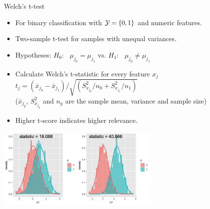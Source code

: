 \documentclass[11pt,compress,t,notes=noshow, xcolor=table]{beamer}
\begin{document}

  \begin{vbframe}{Welch's \MakeLowercase{t}-test}
  \begin{itemize}
  \setlength{\itemsep}{0.6em}
    \item For binary classification with $\mathcal{Y} = \{ 0, 1\}$ and numeric features.
    \item Two-sample t-test for samples with unequal variances.
   \item Hypotheses:
    $H_0$: $\;\;\mu_{j_0} = \mu_{j_1} $ \qquad vs. \qquad $H_1$: $\;\;\mu_{j_0} \neq \mu_{j_1}$

    \item Calculate Welch's t-statistic for every feature $x_j$
    $ t_j = (\bar{x}_{j_0} - \bar{x}_{j_1})/ \sqrt{(S^2_{x_{j_0}}/n_0 + S^2_{x_{j_1}}/n_1)}$\\
    ($\bar{x}_{j_y}$, $S^2_{x_{j_{y}}}$ and $n_y$ are the sample mean, %
    variance and sample size)
    \item Higher t-score indicates higher relevance.
  \end{itemize}
\vspace{-0.01cm}
  \begin{center}
\includegraphics[width=0.6\textwidth, height=0.29\textheight]{figure/fs-t-test.png}
  \end{center}
  
  \end{vbframe}
\end{document}
